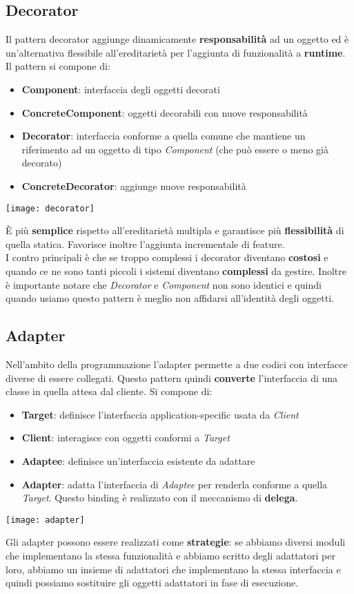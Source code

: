 \subsection{Decorator}
Il pattern decorator aggiunge dinamicamente \textbf{responsabilità} ad un oggetto ed è un'alternativa flessibile all'ereditarietà per l'aggiunta di funzionalità a \textbf{runtime}. Il pattern si compone di:
\begin{itemize}
	\item \textbf{Component}: interfaccia degli oggetti decorati
	\item \textbf{ConcreteComponent}: oggetti decorabili con nuove responsabilità
	\item \textbf{Decorator}: interfaccia conforme a quella comune che mantiene un riferimento ad un oggetto di tipo \textit{Component} (che può essere o meno già decorato)
	\item \textbf{ConcreteDecorator}: aggiunge nuove responsabilità
\end{itemize}
\begin{center}
	\texttt{[image: decorator]}
\end{center}
È più \textbf{semplice} rispetto all'ereditarietà multipla e garantisce più \textbf{flessibilità} di quella statica. Favorisce inoltre l'aggiunta incrementale di feature.\\
I contro principali è che se troppo complessi i decorator diventano \textbf{costosi} e quando ce ne sono tanti piccoli i sistemi diventano \textbf{complessi} da gestire. Inoltre è importante notare che \textit{Decorator} e \textit{Component} non sono identici e quindi quando usiamo questo pattern è meglio non affidarsi all'identità degli oggetti.

\subsection{Adapter}
Nell'ambito della programmazione l'adapter permette a due codici con interfacce diverse di essere collegati. Questo pattern quindi \textbf{converte} l'interfaccia di una classe in quella attesa dal cliente. Si compone di:
\begin{itemize}
	\item \textbf{Target}: definisce l'interfaccia application-specific usata da \textit{Client}
	\item \textbf{Client}: interagisce con oggetti conformi a \textit{Target}
	\item \textbf{Adaptee}: definisce un'interfaccia esistente da adattare
	\item \textbf{Adapter}: adatta l'interfaccia di \textit{Adaptee} per renderla conforme a quella \textit{Target}. Questo binding è realizzato con il meccanismo di \textbf{delega}.
\end{itemize}
\begin{center}
	\texttt{[image: adapter]}
\end{center}
Gli adapter possono essere realizzati come \textbf{strategie}: se abbiamo diversi moduli che implementano la stessa funzionalità e abbiamo scritto degli adattatori per loro, abbiamo un insieme di adattatori che implementano la stessa interfaccia e quindi possiamo sostituire gli oggetti adattatori in fase di esecuzione.

